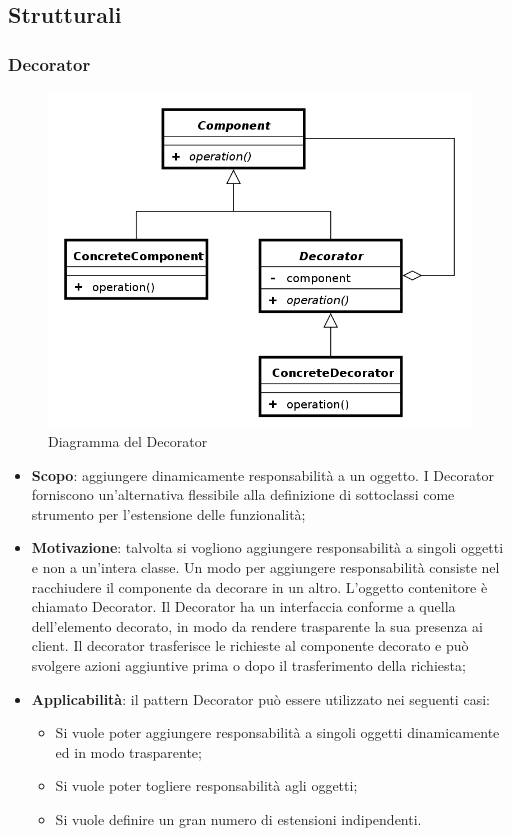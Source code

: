 	\subsection{ Strutturali}

		\subsubsection{Decorator}
		\begin{figure}[H]
		\centering
		\includegraphics[width=0.5\linewidth]{GraficiAppendici/decorator.png}
		\caption{Diagramma del  Decorator}
	\end{figure}
	\begin{itemize}
	\item \textbf{Scopo}: aggiungere dinamicamente responsabilità a un oggetto. I Decorator forniscono
un’alternativa flessibile alla definizione di sottoclassi come strumento per l’estensione delle funzionalità;
	\item \textbf{Motivazione}: talvolta si vogliono aggiungere responsabilità a singoli oggetti e
non a un’intera classe. Un modo per aggiungere responsabilità consiste nel racchiudere il componente da
decorare in un altro. L’oggetto contenitore è chiamato Decorator. Il Decorator ha un interfaccia conforme a quella dell’elemento decorato, in modo da rendere trasparente la sua presenza ai client. Il decorator trasferisce le richieste al componente decorato e può svolgere azioni aggiuntive prima o dopo il trasferimento della richiesta;
	\item \textbf{Applicabilità}: il pattern Decorator può essere utilizzato nei seguenti casi:
	\begin{itemize}
	\item Si vuole poter aggiungere responsabilità a singoli oggetti dinamicamente ed in modo trasparente;
	\item Si vuole poter togliere responsabilità agli oggetti;
	\item Si vuole definire un gran numero di estensioni indipendenti.
	\end{itemize}
\end{itemize}

